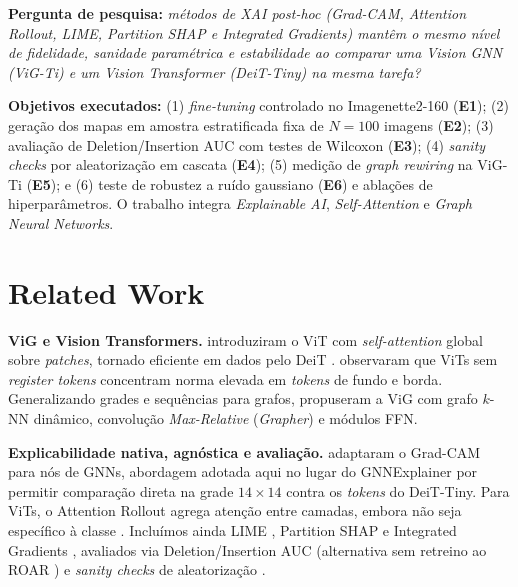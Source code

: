 \documentclass{article}
\begin{document}
\textbf{Pergunta de pesquisa:} \textit{métodos de XAI post-hoc (Grad-CAM, Attention Rollout, LIME, Partition SHAP e Integrated Gradients) mantêm o mesmo nível de fidelidade, sanidade paramétrica e estabilidade ao comparar uma Vision GNN (ViG-Ti) e um Vision Transformer (DeiT-Tiny) na mesma tarefa?}

\textbf{Objetivos executados:} (1) \textit{fine-tuning} controlado no Imagenette2-160 (\textbf{E1}); (2) geração dos mapas em amostra estratificada fixa de $N = 100$ imagens (\textbf{E2}); (3) avaliação de Deletion/Insertion AUC com testes de Wilcoxon (\textbf{E3}); (4) \textit{sanity checks} por aleatorização em cascata (\textbf{E4}); (5) medição de \textit{graph rewiring} na ViG-Ti (\textbf{E5}); e (6) teste de robustez a ruído gaussiano (\textbf{E6}) e ablações de hiperparâmetros. O trabalho integra \textit{Explainable AI}, \textit{Self-Attention} e \textit{Graph Neural Networks}.

\section{Related Work}
\label{sec:related}

\textbf{ViG e Vision Transformers.} \citet{dosovitskiy2021vit} introduziram o ViT com \textit{self-attention} global sobre \textit{patches}, tornado eficiente em dados pelo DeiT \citep{touvron2021deit}. \citet{darcet2024registers} observaram que ViTs sem \textit{register tokens} concentram norma elevada em \textit{tokens} de fundo e borda. Generalizando grades e sequências para grafos, \citet{han2022vig} propuseram a ViG com grafo $k$-NN dinâmico, convolução \textit{Max-Relative} (\textit{Grapher}) e módulos FFN.

\textbf{Explicabilidade nativa, agnóstica e avaliação.} \citet{pope2019gnn} adaptaram o Grad-CAM \citep{selvaraju2017gradcam} para nós de GNNs, abordagem adotada aqui no lugar do GNNExplainer \citep{ying2019gnnexplainer} por permitir comparação direta na grade $14 \times 14$ contra os \textit{tokens} do DeiT-Tiny. Para ViTs, o Attention Rollout \citep{abnar2020rollout} agrega atenção entre camadas, embora não seja específico à classe \citep{chefer2021transformer}. Incluímos ainda LIME \citep{ribeiro2016lime}, Partition SHAP \citep{lundberg2017shap} e Integrated Gradients \citep{sundararajan2017ig}, avaliados via Deletion/Insertion AUC \citep{petsiuk2018rise} (alternativa sem retreino ao ROAR \citep{hooker2019roar}) e \textit{sanity checks} de aleatorização \citep{adebayo2018sanity}.
\end{document}
